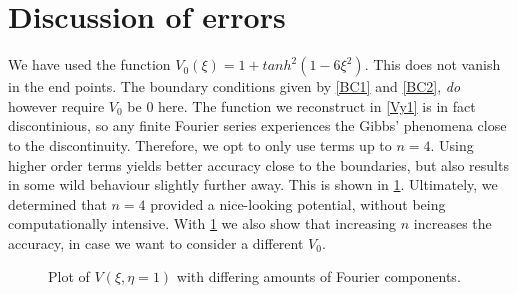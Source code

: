 \documentclass[11p, a4paper, english]{article}
\begin{document}
\section{Discussion of errors}

We have used the function $V_{0}(\xi) = 1 + tanh^{2}(1 - 6\xi^{2})$. This does not vanish in the end points. The boundary conditions given by \cref{BC1} and \cref{BC2}, \textit{do} however require $V_{0}$ be $0$ here. The function we reconstruct in \cref{Vy1} is in fact discontinious, so any finite Fourier series experiences the Gibbs' phenomena close to the discontinuity. Therefore, we opt to only use terms up to $n=4$. Using higher order terms yields better accuracy close to the boundaries, but also results in some wild behaviour slightly further away. This is shown in \cref{compFourier}. Ultimately, we determined that $n=4$ provided a nice-looking potential, without being computationally intensive. With \cref{compFourier} we also show that increasing $n$ increases the accuracy, in case we want to consider a different $V_{0}$.


\begin{figure}[h!]
\centering
{}
\qquad
{}
\caption{Plot of $V(\xi, \eta=1)$ with differing amounts of Fourier components.}
\label{compFourier}
\end{figure}
\end{document}
